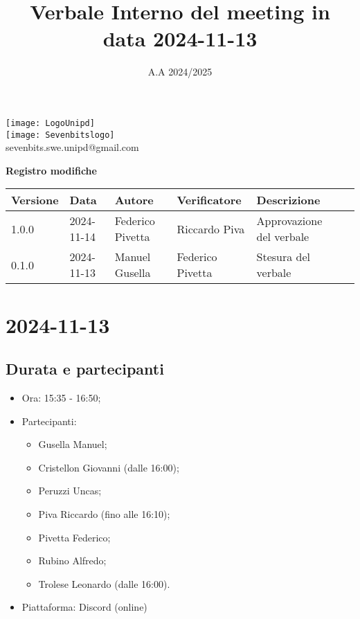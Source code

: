 \documentclass[10pt]{article}
\title{Verbale Interno del meeting in data 2024-11-13}
\date{A.A 2024/2025}
\begin{document}
\maketitle
\begin{center}
\texttt{[image: LogoUnipd]}\\
\texttt{[image: Sevenbitslogo]}\\
sevenbits.swe.unipd@gmail.com\\
\vspace{2mm}

\textbf{Registro modifiche}\\
\vspace{2mm}
\begin{tabular}{|l|l|l|l|l|l|}
\hline
\textbf{Versione} & \textbf{Data} & \textbf{Autore} & \textbf{Verificatore} & \textbf{Descrizione} \\
\hline
1.0.0 & 2024-11-14 & Federico Pivetta & Riccardo Piva & Approvazione del verbale\\
\hline
0.1.0 & 2024-11-13 & Manuel Gusella & Federico Pivetta & Stesura del verbale\\
\hline
\end{tabular}
\end{center}

\newpage
\tableofcontents
\newpage
\section{2024-11-13}
\subsection{Durata e partecipanti}
\begin{itemize}
\item Ora: 15:35 - 16:50;
\item Partecipanti: 	
	\begin{itemize}
	\item Gusella Manuel;
	\item Cristellon Giovanni (dalle 16:00);
	\item Peruzzi Uncas;
	\item Piva Riccardo (fino alle 16:10);
	\item Pivetta Federico;
	\item Rubino Alfredo;
	\item Trolese Leonardo (dalle 16:00).
	\end{itemize}
\item Piattaforma: Discord (online)
\end{itemize}
\end{document}
